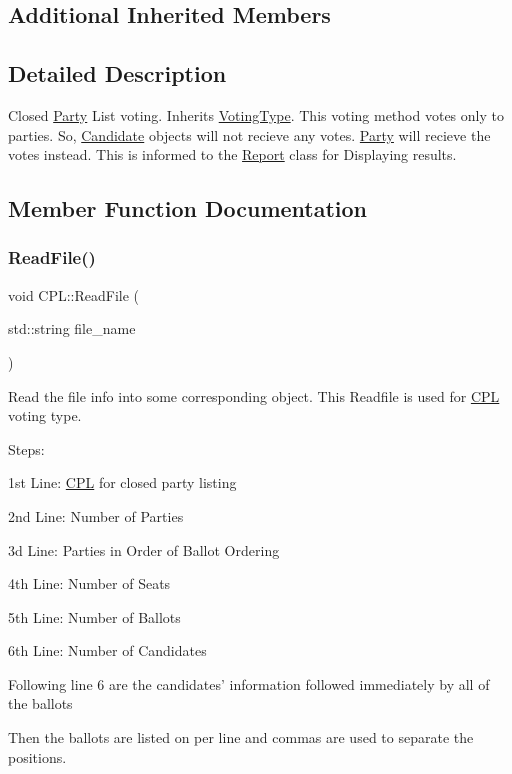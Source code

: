 \subsection*{Additional Inherited Members}


\subsection{Detailed Description}
Closed \hyperlink{classParty}{Party} List voting. Inherits \hyperlink{classVotingType}{Voting\+Type}. This voting method votes only to parties. So, \hyperlink{classCandidate}{Candidate} objects will not recieve any votes. \hyperlink{classParty}{Party} will recieve the votes instead. This is informed to the \hyperlink{classReport}{Report} class for Displaying results. 

\subsection{Member Function Documentation}
\mbox{\label{classCPL_a6da772d37fd8800873a4f8fbd7da4691}} 
\subsubsection{\texorpdfstring{Read\+File()}{ReadFile()}}
{\footnotesize\ttfamily void C\+P\+L\+::\+Read\+File (\begin{DoxyParamCaption}\item[{std\+::string}]{file\+\_\+name }\end{DoxyParamCaption})\hspace{0.3cm}{\ttfamily [override]}}



Read the file info into some corresponding object. This Readfile is used for \hyperlink{classCPL}{C\+PL} voting type. 

Steps\+:
\begin{DoxyItemize}
\item 1st Line\+: \hyperlink{classCPL}{C\+PL} for closed party listing
\item 2nd Line\+: Number of Parties
\item 3d Line\+: Parties in Order of Ballot Ordering
\item 4th Line\+: Number of Seats
\item 5th Line\+: Number of Ballots
\item 6th Line\+: Number of Candidates
\item Following line 6 are the candidates’ information followed immediately by all of the ballots
\item Then the ballots are listed on per line and commas are used to separate the positions.
\end{DoxyItemize}

